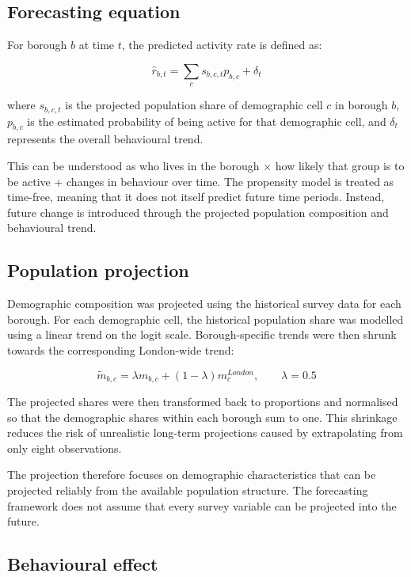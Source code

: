 \documentclass[ %
                    author={Ashrey Ashrey, Sanya Kapoor, Trisha Sharma, Yash Bhooshan Pandloskar},
                supervisor={Dr. Dalila O’Grady},
                    degree={MSc},
                     title={Using machine learning to forecast physical activity participation, volunteering and activity patterns in London},
                  subtitle={},
                      type={},
                      year={2021}]{dissertation}
\begin{document}
\FloatBarrier
\subsection{Forecasting equation}

\noindent
For borough \(b\) at time \(t\), the predicted activity rate is defined as:

\[
\widehat{r}_{b,t}
=
\sum_{c} s_{b,c,t}p_{b,c}
+
\delta_t
\]

where \(s_{b,c,t}\) is the projected population share of demographic cell \(c\) in borough \(b\), \(p_{b,c}\) is the estimated probability of being active for that demographic cell, and \(\delta_t\) represents the overall behavioural trend.

This can be understood as who lives in the borough \(\times\) how likely that group is to be active + changes in behaviour over time. The propensity model is treated as time-free, meaning that it does not itself predict future time periods. Instead, future change is introduced through the projected population composition and behavioural trend.

\FloatBarrier
\subsection{Population projection}

\noindent
Demographic composition was projected using the historical survey data for each borough. For each demographic cell, the historical population share was modelled using a linear trend on the logit scale. Borough-specific trends were then shrunk towards the corresponding London-wide trend:

\[
\widetilde{m}_{b,c}
=
\lambda m_{b,c}
+
(1-\lambda)m_c^{London},
\qquad
\lambda=0.5
\]

The projected shares were then transformed back to proportions and normalised so that the demographic shares within each borough sum to one. This shrinkage reduces the risk of unrealistic long-term projections caused by extrapolating from only eight observations.

The projection therefore focuses on demographic characteristics that can be projected reliably from the available population structure. The forecasting framework does not assume that every survey variable can be projected into the future.

\FloatBarrier
\subsection{Behavioural effect}
\end{document}
